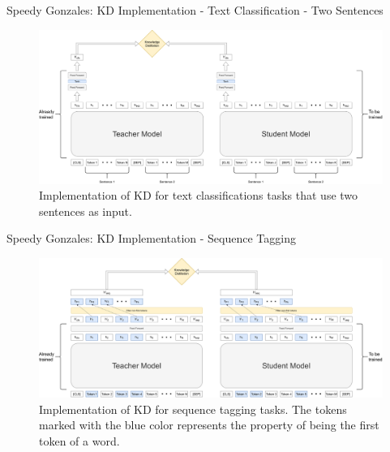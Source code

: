 \documentclass[aspectratio=169,xcolor=dvipsnames]{beamer}
\begin{document}
\begin{frame}{Speedy Gonzales: KD Implementation - Text Classification - Two Sentences}

\begin{figure}
    \centering
    \includegraphics[width=0.88\columnwidth]{images/two-sentences-text-classification-kd.pdf}
    \caption{Implementation of KD for text classifications tasks that use two sentences as input.}
    \label{fig:two-sentences-text-classification-kd}
\end{figure}

\end{frame}
\begin{frame}{Speedy Gonzales: KD Implementation - Sequence Tagging}

\begin{figure}
    \centering
    \includegraphics[width=0.9\columnwidth]{images/KD-sequence-tagging.pdf}
    \caption{Implementation of KD for sequence tagging tasks. The tokens marked with the blue color represents the property of being the first token of a word.}
    \label{fig:KD-sequence-tagging}
\end{figure}

\end{frame}
\end{document}
